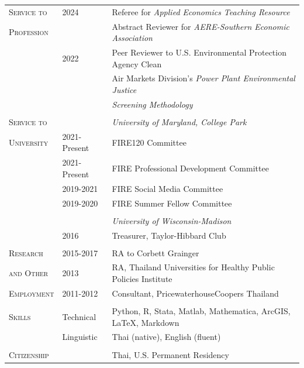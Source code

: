 \documentclass[letterpaper,11pt,oneside]{article}\usepackage[]{graphicx}\usepackage[]{xcolor}
\begin{document}
                    	
\newpage                   	
\noindent \begin{tabular}{p{1.2in} p{0.9in} l}                         	
\textsc{Service to}   & 2024          & Referee for \textit{Applied Economics Teaching Resource} \\
\textsc{Profession}   &               & Abstract Reviewer for \textit{AERE-Southern Economic Association} \\
                      & 2022          & Peer Reviewer to U.S. Environmental Protection Agency Clean \\
                      &               & Air Markets Division's \textit{Power Plant Environmental Justice} \\
                  		&               & \textit{Screening Methodology} \\
                      & & \\
                    
\textsc{Service to}		&               & \textit{University of Maryland, College Park} \\
\textsc{University}	  & 2021-Present  & FIRE120 Committee \\
                      & 2021-Present	& FIRE Professional Development Committee \\
                      & 2019-2021 	  & FIRE Social Media Committee \\
                      & 2019-2020 	  & FIRE Summer Fellow Committee \\
                      & & \\  
                      &               & \textit{University of Wisconsin-Madison} \\
                		  & 2016			    & Treasurer, Taylor-Hibbard Club\\
				              & 				      & \\
                        
\textsc{Research}		& 2015-2017	        & RA to Corbett Grainger\\
\textsc{and Other}	& 2013 				      & RA, Thailand Universities for Healthy Public Policies Institute\\
\textsc{Employment}	& 2011-2012 		    & Consultant, PricewaterhouseCoopers Thailand\\
                    & 				          & \\
\textsc{Skills}	& Technical   & Python, R, Stata, Matlab, Mathematica, ArcGIS, \LaTeX, Markdown \\
        		    & Linguistic & Thai (native), English (fluent) \\
                    & 				          & \\        		    
\textsc{Citizenship} & & Thai, U.S. Permanent Residency	    
\end{tabular}
					
\end{document}
